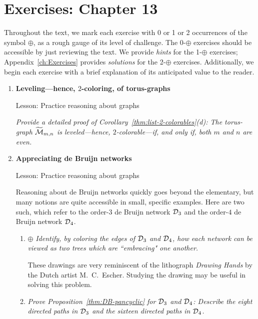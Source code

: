 
\section{Exercises: Chapter 13}

Throughout the text, we mark each exercise with 0 or 1 or 2 occurrences of the symbol $\oplus$, as a rough gauge of its level of challenge.  The 0-$\oplus$ exercises should be accessible by just reviewing the text.  We provide {\em hints} for the 1-$\oplus$ exercises; Appendix~\ref{ch:Exercises} provides {\em solutions} for the 2-$\oplus$ exercises.  Additionally, we begin each exercise with a brief explanation of its anticipated value to the reader.
 

\begin{enumerate}
\item
{\bf Leveling---hence, $2$-coloring, of torus-graphs}

{\sc Lesson:} Practice reasoning about graphs

\smallskip

{\em Provide a detailed proof of Corollary~\ref{thm:list-2-colorables}(d):  The torus-graph $\widetilde{\mbox{$\cal M$}}_{m,n}$ is leveled---hence, $2$-colorable---if, and only if, both $m$ and $n$ are even.}

\medskip\item
{\bf Appreciating de Bruijn networks}

{\sc Lesson:} Practice reasoning about graphs

\smallskip

Reasoning about de Bruijn networks quickly goes beyond the elementary, but many notions are quite accessible in small, specific examples.  Here are two such, which refer to the order-$3$ de Bruijn network $\mbox{$\cal D$}_3$ and the order-$4$ de Bruijn network $\mbox{$\cal D$}_4$.

  \begin{enumerate}
  \item
$\oplus$
{\em Identify, by coloring the edges of $\mbox{$\cal D$}_3$ and $\mbox{$\cal D$}_4$, how each network can be viewed as two trees which are ``embracing" one another.}

\smallskip

These drawings are very reminiscent of the lithograph {\it Drawing Hands} by the Dutch artist M.~C.~Escher.  Studying the drawing may be useful in solving this problem.

  \medskip\item 
{\em Prove Proposition~\ref{thm:DB-pancyclic} for $\mbox{$\cal D$}_3$ and $\mbox{$\cal D$}_4$: Describe the eight directed paths in $\mbox{$\cal D$}_3$ and the sixteen directed paths in $\mbox{$\cal D$}_4$.}
  \end{enumerate}


\end{enumerate}
